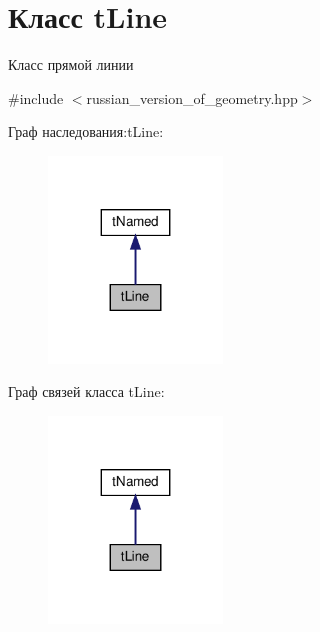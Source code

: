 \hypertarget{classtLine}{}\section{Класс t\+Line}
\label{classtLine}


Класс прямой линии  




{\ttfamily \#include $<$russian\+\_\+version\+\_\+of\+\_\+geometry.\+hpp$>$}



Граф наследования\+:t\+Line\+:\nopagebreak
\begin{figure}[H]
\begin{center}
\leavevmode
\includegraphics[width=131pt]{classtLine__inherit__graph}
\end{center}
\end{figure}


Граф связей класса t\+Line\+:\nopagebreak
\begin{figure}[H]
\begin{center}
\leavevmode
\includegraphics[width=131pt]{classtLine__coll__graph}
\end{center}
\end{figure}
